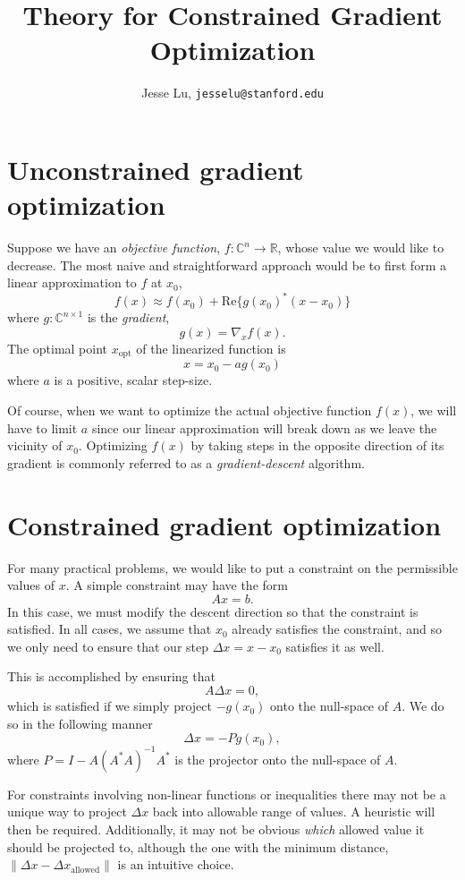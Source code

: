 \documentclass{article}
\title{Theory for Constrained Gradient Optimization}
\author{Jesse Lu, \texttt{jesselu@stanford.edu}}
\newcommand{\C}{\mathbb{C}}
\newcommand{\R}{\mathbb{R}}
\newcommand{\be}{\begin{equation}}
\newcommand{\ee}{\end{equation}}
\newcommand{\grad}{\nabla}
\begin{document}
\maketitle
\tableofcontents

\section{Unconstrained gradient optimization}
Suppose we have an \emph{objective function}, $f: \C^n \to \R$, whose value we would like to decrease. 
The most naive and straightforward approach would be to first form a linear approximation to $f$ at $x_0$,
\be f(x) \approx f(x_0) + \text{Re}\{g(x_0)^*(x - x_0)\} \ee
where $g: \C^{n \times 1} $ is the \emph{gradient},
\be g(x) = \grad_x f(x). \ee
The optimal point $x_\text{opt}$ of the linearized function is
\be x = x_0 - ag(x_0) \ee
where $a$ is a positive, scalar step-size.

Of course, when we want to optimize the actual objective function $f(x)$, we will have to limit $a$ since our linear approximation will break down as we leave the vicinity of $x_0$.
Optimizing $f(x)$ by taking steps in the opposite direction of its gradient is commonly referred to as a \emph{gradient-descent} algorithm.

\section{Constrained gradient optimization}
For many practical problems, we would like to put a constraint on the permissible values of $x$. 
A simple constraint may have the form
\be Ax = b. \ee
In this case, we must modify the descent direction so that the constraint is satisfied. 
In all cases, we assume that $x_0$ already satisfies the constraint, and so we only need to ensure that our step $\Delta x = x - x_0$ satisfies it as well.

This is accomplished by ensuring that 
\be A \Delta x = 0, \ee
which is satisfied if we simply project $-g(x_0)$ onto the null-space of $A$. 
We do so in the following manner
\be \Delta x = -Pg(x_0), \ee
where $P = I - A(A^*A)^{-1}A^*$ is the projector onto the null-space of $A$.

For constraints involving non-linear functions or inequalities there may not be a unique way to project $\Delta x$ back into allowable range of values. 
A heuristic will then be required.
Additionally, it may not be obvious \emph{which} allowed value it should be projected to, although the one with the minimum distance, $\|\Delta x - \Delta x_\text{allowed}\|$ is an intuitive choice.
\end{document}
